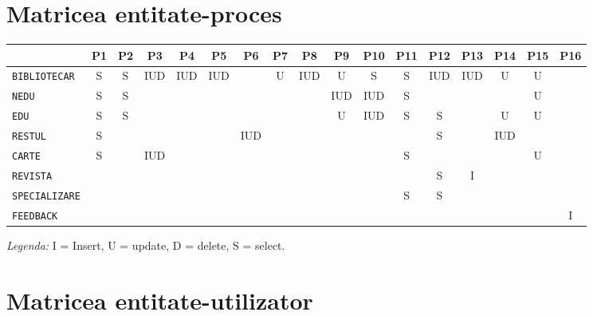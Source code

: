 
\section{Matricea entitate-proces}
\label{sec:matr-ep}

\begin{center}
  \footnotesize
  \begin{tabular}{|l|c|c|c|c|c|c|c|c|c|c|c|c|c|c|c|c|}
    \hline
    & P1 & P2 & P3 & P4 & P5 & P6 & P7 & P8 & P9 & P10 & P11 & P12 & P13 & P14 & P15 & P16 \\
    \hline \hline
    \texttt{BIBLIOTECAR} & S & S & IUD & IUD & IUD & & U & IUD & U & S & S & IUD & IUD & U & U & \\
    \hline
    \texttt{NEDU} & S & S & & & & & & & IUD & IUD & S & & & & U & \\
    \hline
    \texttt{EDU} & S & S & & & & & & & U & IUD & S & S & & U & U & \\
    \hline
    \texttt{RESTUL} & S & & & & & IUD & & & & & & S & & IUD & & \\
    \hline
    \texttt{CARTE} & S & & IUD & & & & & & & & S & & & & U & \\
    \hline
    \texttt{REVISTA} & & & & & & & & & & & & S & I & & & \\
    \hline
    \texttt{SPECIALIZARE} & & & & & & & & & & & S & S & & & & \\
    \hline
    \texttt{FEEDBACK} & & & & & & & & & & & & & & & & I \\
    \hline
  \end{tabular}
\end{center}

\emph{Legenda:} I = Insert, U = update, D = delete, S = select.


\section{Matricea entitate-utilizator}
\label{sec:matr-eu}

